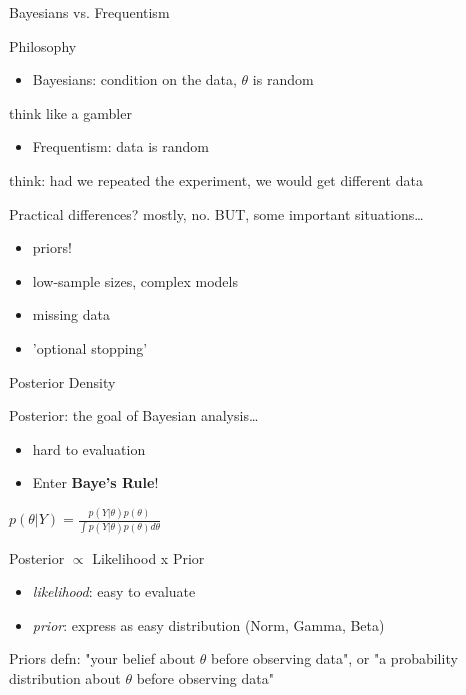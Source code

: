 \documentclass[presentation]{beamer}
\begin{document}
\begin{frame}[label=sec-17]{Bayesians vs. Frequentism}
\begin{block}{Philosophy}
\begin{itemize}
\item Bayesians: condition on the data, $\theta$ is random
\end{itemize}
think like a gambler
\begin{itemize}
\item Frequentism: data is random
\end{itemize}
think: had we repeated the experiment, we would get different data
\end{block}

\begin{block}{Practical differences?}
mostly, no. BUT, some important situations\ldots{}
\begin{itemize}
\item priors!
\item low-sample sizes, complex models
\item missing data
\item 'optional stopping'
\end{itemize}
\end{block}
\end{frame}

\begin{frame}[label=sec-18]{Posterior Density}
\begin{block}{Posterior: the goal of Bayesian analysis\ldots{}}
\begin{itemize}
\item hard to evaluation
\item Enter \textbf{Baye's Rule}!
\end{itemize}
\begin{center}
$p(\theta\vert Y) = \frac{p(Y\vert \theta)p(\theta)}{\int p(Y\vert \theta)p(\theta) d \theta}$
\end{center}
\end{block}

\begin{block}{Posterior $\propto$ Likelihood x Prior}
\begin{itemize}
\item \emph{likelihood}: easy to evaluate
\item \emph{prior}: express as easy distribution (Norm, Gamma, Beta)
\end{itemize}
\end{block}

\begin{block}{Priors}
defn: "your belief about $\theta$ before observing data", or "a probability distribution about $\theta$ before observing data"
\end{block}
\end{frame}
\end{document}
